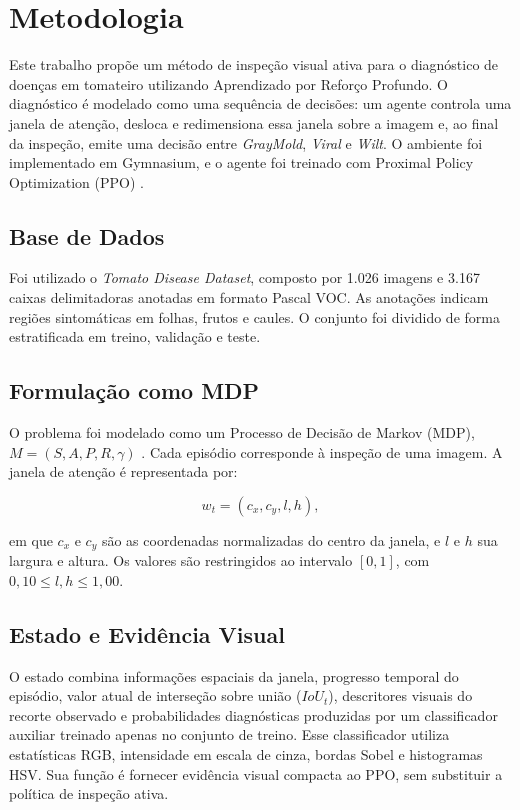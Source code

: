 \section{Metodologia}

Este trabalho propõe um método de inspeção visual ativa para o diagnóstico de doenças
em tomateiro utilizando Aprendizado por Reforço Profundo. O diagnóstico é modelado como
uma sequência de decisões: um agente controla uma janela de atenção, desloca e
redimensiona essa janela sobre a imagem e, ao final da inspeção, emite uma decisão
entre \textit{GrayMold}, \textit{Viral} e \textit{Wilt}. O ambiente foi implementado em
Gymnasium, e o agente foi treinado com Proximal Policy Optimization (PPO)
\cite{schulman2017ppo}.

\subsection{Base de Dados}

Foi utilizado o \textit{Tomato Disease Dataset}, composto por 1.026 imagens e 3.167
caixas delimitadoras anotadas em formato Pascal VOC. As anotações indicam regiões
sintomáticas em folhas, frutos e caules. O conjunto foi dividido de forma estratificada
em treino, validação e teste.

\subsection{Formulação como MDP}

O problema foi modelado como um Processo de Decisão de Markov (MDP),
$M=(S,A,P,R,\gamma)$ \cite{sutton2018,puterman1994}. Cada episódio corresponde à
inspeção de uma imagem. A janela de atenção é representada por:

\begin{equation}
w_t = (c_x, c_y, l, h),
\end{equation}

\noindent em que $c_x$ e $c_y$ são as coordenadas normalizadas do centro da janela, e
$l$ e $h$ sua largura e altura. Os valores são restringidos ao intervalo $[0,1]$, com
$0{,}10 \leq l,h \leq 1{,}00$.

\subsection{Estado e Evidência Visual}

O estado combina informações espaciais da janela, progresso temporal do episódio, valor
atual de interseção sobre união ($IoU_t$), descritores visuais do recorte observado e
probabilidades diagnósticas produzidas por um classificador auxiliar treinado apenas no
conjunto de treino. Esse classificador utiliza estatísticas RGB, intensidade em escala
de cinza, bordas Sobel e histogramas HSV. Sua função é fornecer evidência visual
compacta ao PPO, sem substituir a política de inspeção ativa.


